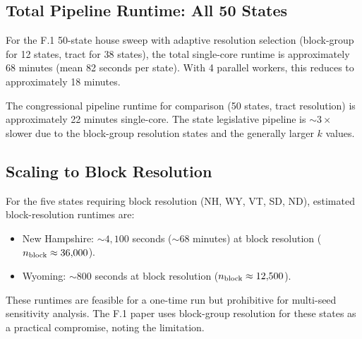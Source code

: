 \subsection{Total Pipeline Runtime: All 50 States}
\label{sec:runtime:total}

For the F.1 50-state house sweep with adaptive resolution selection
(block-group for 12 states, tract for 38 states), the total single-core runtime is
approximately 68 minutes (mean 82 seconds per state). With 4 parallel workers,
this reduces to approximately 18 minutes.

The congressional pipeline runtime for comparison (50 states, tract resolution)
is approximately 22 minutes single-core. The state legislative pipeline is
$\sim\!3\times$ slower due to the block-group resolution states and the
generally larger $k$ values.

\subsection{Scaling to Block Resolution}
\label{sec:runtime:block}

For the five states requiring block resolution (NH, WY, VT, SD, ND), estimated
block-resolution runtimes are:
\begin{itemize}
  \item New Hampshire: $\sim\!4{,}100$ seconds ($\sim\!68$ minutes) at block
    resolution ($n_{\rm block} \approx 36{,}000$).
  \item Wyoming: $\sim\!800$ seconds at block resolution
    ($n_{\rm block} \approx 12{,}500$).
\end{itemize}
These runtimes are feasible for a one-time run but prohibitive for multi-seed
sensitivity analysis. The F.1 paper uses block-group resolution for these states
as a practical compromise, noting the limitation.
